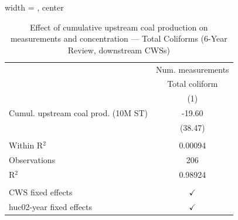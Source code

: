 
\begin{table}[htbp]
   
   \caption{\label{tab:6yr_huc02fe_cnt_tc} Effect of cumulative upstream coal production on measurements and concentration — Total Coliforms (6-Year Review, downstream CWSs)}
   \bigskip
   
   \centering
   
   \begin{adjustbox}{width = \textwidth, center}
      
      
      \begin{tabular}{lc}
         \toprule
         
                                             & Num. measurements\\  
         
                                             & Total coliform \\   
         
                                             & (1)\\  
         
         \midrule 
         Cumul. upstream coal prod. (10M ST) & -19.60\\   
                                             & (38.47)\\   
         
          \\
         
         Within R$^2$                        & 0.00094\\  
         Observations                        & 206\\  
         R$^2$                               & 0.98924\\  
         
          \\
         
         CWS fixed effects                   & $\checkmark$\\   
         huc02-year fixed effects            & $\checkmark$\\   
         
         \bottomrule
         
      \end{tabular}
      
      

\end{adjustbox}
\end{table}
